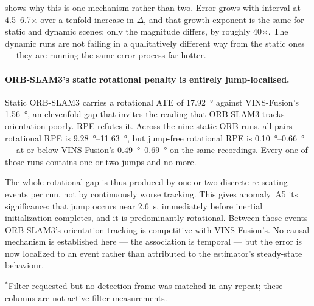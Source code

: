  shows why this is one mechanism rather than two. Error grows
with interval at \numrange{4.5}{6.7}$\times$ over a tenfold increase in
$\Delta$, and that growth exponent is the same for static and dynamic scenes;
only the magnitude differs, by roughly \num{40}$\times$. The dynamic runs are
not failing in a qualitatively different way from the static ones --- they are
running the same error process far hotter.

\paragraph{ORB-SLAM3's static rotational penalty is entirely jump-localised.}
Static ORB-SLAM3 carries a rotational ATE of \SI{17.92}{\degree} against
VINS-Fusion's \SI{1.56}{\degree}, an elevenfold gap that invites the reading
that ORB-SLAM3 tracks orientation poorly. RPE refutes it. Across the nine static
ORB runs, all-pairs rotational RPE is \SIrange{9.28}{11.63}{\degree}, but
jump-free rotational RPE is \SIrange{0.10}{0.66}{\degree} --- at or below
VINS-Fusion's \SIrange{0.49}{0.69}{\degree} on the same recordings. Every one of
those runs contains one or two jumps and no more.

The whole rotational gap is thus produced by one or two discrete re-seating
events per run, not by continuously worse tracking. This gives anomaly~A5 its
significance: that jump occurs near \SI{2.6}{\second}, immediately before
inertial initialization completes, and it is predominantly rotational. Between
those events ORB-SLAM3's orientation tracking is competitive with VINS-Fusion's.
No causal mechanism is established here --- the association is temporal --- but
the error is now localized to an event rather than attributed to the estimator's
steady-state behaviour.

\begin{table}
\centering
\caption{Truth-based trajectory error for every repeat of the relogged
campaign. Every dataset is a no-floor-texture world, so that shared part of each
dataset name is omitted. ``ATE'' and ``clean'' are global and
longest-clean-segment ATE RMSE in metres, ``rot'' is rotational geodesic RMSE in
degrees, and ``jmp'' counts steps implying more than \SI{10}{\metre\per\second}.
All 66 runs are operational; two static ORB run summaries have incomplete
schemas, and only one of 12 ORB baseline/filter pairs passed input matching.
Static datasets were not run in either filtered mode; those cells are set to --.}
\label{tab:truth-summary}
\scriptsize
\setlength{\tabcolsep}{4pt}


\vspace{1ex}
\raggedright\footnotesize
$^{*}$Filter requested but no detection frame was matched in any repeat; these
columns are not active-filter measurements.
\end{table}

